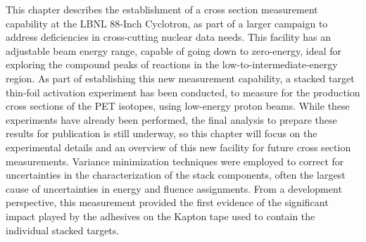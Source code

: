 This chapter describes the establishment of a cross section measurement capability at   
the LBNL 88-Inch Cyclotron, as part of a larger campaign to address deficiencies in cross-cutting nuclear data needs.  
This facility has an adjustable beam energy range, capable of going down to zero-energy, ideal for exploring the compound peaks of reactions in the low-to-intermediate-energy region.
As part of establishing this new measurement capability, a  stacked target thin-foil activation experiment  has been conducted, to measure for the production cross sections of the  PET isotopes, using low-energy proton beams.
While these experiments have already been performed, the final analysis to prepare these results for publication is still underway, so this chapter will focus on the experimental details and an overview of this new facility for future cross section measurements.
Variance minimization techniques were employed  to correct for uncertainties in  the characterization of the stack components, often the largest cause of uncertainties in energy and  fluence assignments.
From a development perspective, this measurement provided the first evidence of the significant impact  played by the adhesives on the Kapton tape used to contain the individual stacked targets. 
